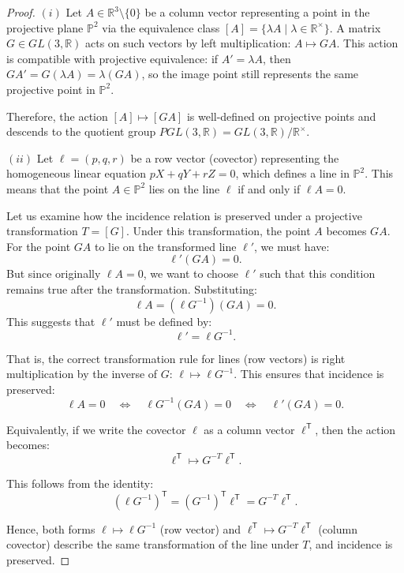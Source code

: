 \documentclass[12pt,reqno]{amsart}
\begin{document}
\begin{proof}
$(i)$    
Let \(A \in \mathbb{R}^3 \setminus \{0\}\) be a column vector representing a point in the projective plane \(\mathbb{P}^2\) via the equivalence class \([A] = \{\lambda A \mid \lambda \in \mathbb{R}^{\times}\}\).  
A matrix \(G \in GL(3,\mathbb{R})\) acts on such vectors by left multiplication: \(A \mapsto G A\).
This action is compatible with projective equivalence: if \(A' = \lambda A\), then \(G A' = G (\lambda A) = \lambda (G A)\), so the image point still represents the same projective point in \(\mathbb{P}^2\).

Therefore, the action \([A] \mapsto [G A]\) is well-defined on projective points and descends to the quotient group \(PGL(3,\mathbb{R}) = GL(3,\mathbb{R})/\mathbb{R}^\times\).

\smallskip
$(ii)$  
Let \(\ell = (p, q, r)\) be a row vector (covector) representing the homogeneous linear equation \(pX + qY + rZ = 0\), which defines a line in \(\mathbb{P}^2\). This means that the point \(A \in \mathbb{P}^2\) lies on the line \(\ell\) if and only if \(\ell A = 0\).

Let us examine how the incidence relation is preserved under a projective transformation \(T = [G]\). Under this transformation, the point \(A\) becomes \(G A\). For the point \(G A\) to lie on the transformed line \(\ell'\), we must have:
\[
\ell' (G A) = 0.
\]
But since originally \(\ell A = 0\), we want to choose \(\ell'\) such that this condition remains true after the transformation. Substituting:
\[
\ell A = (\ell G^{-1}) (G A) = 0.
\]
This suggests that \(\ell'\) must be defined by:
\[
\ell' = \ell G^{-1}.
\]

That is, the correct transformation rule for lines (row vectors) is right multiplication by the inverse of \(G\): \(\ell \mapsto \ell G^{-1}\). This ensures that incidence is preserved:
\[
\ell A = 0 \quad \Longleftrightarrow \quad \ell G^{-1} (G A) = 0 \quad \Longleftrightarrow \quad \ell' (G A) = 0.
\]

{Equivalently}, if we write the covector \(\ell\) as a column vector \(\ell^{\mathsf T}\), then the action becomes:
\[
\ell^{\mathsf T} \mapsto G^{-T} \ell^{\mathsf T}.
\]

This follows from the identity:
\[
(\ell G^{-1})^{\mathsf T} = (G^{-1})^{\mathsf T} \ell^{\mathsf T} = G^{-T} \ell^{\mathsf T}.
\]

Hence, both forms \(\ell \mapsto \ell G^{-1}\) (row vector) and \(\ell^{\mathsf T} \mapsto G^{-T} \ell^{\mathsf T}\) (column covector) describe the same transformation of the line under \(T\), and incidence is preserved.

\end{proof}
\end{document}
